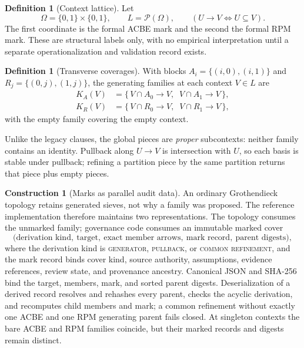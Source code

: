 \documentclass[11pt]{amsart}
\theoremstyle{definition}
\newtheorem{definition}[theorem]{Definition}
\newtheorem{construction}[theorem]{Construction}
\theoremstyle{remark}
\begin{document}
\begin{definition}[Context lattice]\label{def:lattice}
Let
\[
\Omega = \{0,1\}\times\{0,1\}, \qquad L = \mathcal{P}(\Omega), \qquad (U \to V \iff U \subseteq V).
\]
The first coordinate is the formal ACBE mark and the second the formal RPM mark. These are structural labels only, with no empirical interpretation until a separate operationalization and validation record exists.
\end{definition}

\begin{definition}[Transverse coverages]\label{def:covers}
With blocks $A_i=\{(i,0),(i,1)\}$ and $R_j=\{(0,j),(1,j)\}$, the generating families at each context $V \in L$ are
\begin{align*}
K_A(V) &= \{\, V\cap A_0 \to V,\;\; V\cap A_1 \to V \,\}, \\
K_R(V) &= \{\, V\cap R_0 \to V,\;\; V\cap R_1 \to V \,\},
\end{align*}
with the empty family covering the empty context.
\end{definition}

Unlike the legacy clauses, the global pieces are \emph{proper} subcontexts: neither family contains an identity. Pullback along $U \to V$ is intersection with $U$, so each basis is stable under pullback; refining a partition piece by the same partition returns that piece plus empty pieces.

\begin{construction}[Marks as parallel audit data]\label{con:marks}
An ordinary Grothendieck topology retains generated sieves, not why a family was proposed. The reference implementation therefore maintains two representations. The topology consumes the unmarked family; governance code consumes an immutable marked cover
\[
\bigl(\text{derivation kind},\ \text{target},\ \text{exact member arrows},\ \text{mark record},\ \text{parent digests}\bigr),
\]
where the derivation kind is \textsc{generator}, \textsc{pullback}, or \textsc{common refinement}, and the mark record binds cover kind, source authority, assumptions, evidence references, review state, and provenance ancestry. Canonical JSON and SHA-256 bind the target, members, mark, and sorted parent digests. Deserialization of a derived record resolves and rehashes every parent, checks the acyclic derivation, and recomputes child members and mark; a common refinement without exactly one ACBE and one RPM generating parent fails closed. At singleton contexts the bare ACBE and RPM families coincide, but their marked records and digests remain distinct.
\end{construction}
\end{document}
